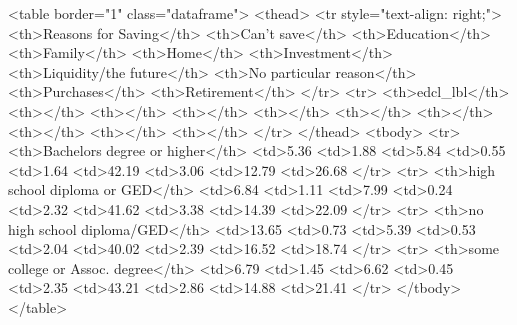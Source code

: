 <table border="1" class="dataframe">
  <thead>
    <tr style="text-align: right;">
      <th>Reasons for Saving</th>
      <th>Can't save</th>
      <th>Education</th>
      <th>Family</th>
      <th>Home</th>
      <th>Investment</th>
      <th>Liquidity/the future</th>
      <th>No particular reason</th>
      <th>Purchases</th>
      <th>Retirement</th>
    </tr>
    <tr>
      <th>edcl_lbl</th>
      <th></th>
      <th></th>
      <th></th>
      <th></th>
      <th></th>
      <th></th>
      <th></th>
      <th></th>
      <th></th>
    </tr>
  </thead>
  <tbody>
    <tr>
      <th>Bachelors degree or higher</th>
      <td>5.36%
      <td>1.88%
      <td>5.84%
      <td>0.55%
      <td>1.64%
      <td>42.19%
      <td>3.06%
      <td>12.79%
      <td>26.68%
    </tr>
    <tr>
      <th>high school diploma or GED</th>
      <td>6.84%
      <td>1.11%
      <td>7.99%
      <td>0.24%
      <td>2.32%
      <td>41.62%
      <td>3.38%
      <td>14.39%
      <td>22.09%
    </tr>
    <tr>
      <th>no high school diploma/GED</th>
      <td>13.65%
      <td>0.73%
      <td>5.39%
      <td>0.53%
      <td>2.04%
      <td>40.02%
      <td>2.39%
      <td>16.52%
      <td>18.74%
    </tr>
    <tr>
      <th>some college or Assoc. degree</th>
      <td>6.79%
      <td>1.45%
      <td>6.62%
      <td>0.45%
      <td>2.35%
      <td>43.21%
      <td>2.86%
      <td>14.88%
      <td>21.41%
    </tr>
  </tbody>
</table>